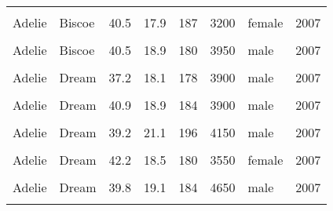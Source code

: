 \documentclass[
  landscape]{article}
\begin{document}
\begin{longtable}[l]{llllllll}
\cellcolor{gray!15}{Adelie} & \cellcolor{gray!15}{Biscoe} & \cellcolor{gray!15}{40.6} & \cellcolor{gray!15}{18.6} & \cellcolor{gray!15}{183} & \cellcolor{gray!15}{3550} & \cellcolor{gray!15}{male} & \cellcolor{gray!15}{2007}\\
Adelie & Biscoe & 40.5 & 17.9 & 187 & 3200 & female & 2007\\
\cellcolor{gray!15}{Adelie} & \cellcolor{gray!15}{Biscoe} & \cellcolor{gray!15}{37.9} & \cellcolor{gray!15}{18.6} & \cellcolor{gray!15}{172} & \cellcolor{gray!15}{3150} & \cellcolor{gray!15}{female} & \cellcolor{gray!15}{2007}\\
Adelie & Biscoe & 40.5 & 18.9 & 180 & 3950 & male & 2007\\
\cellcolor{gray!15}{Adelie} & \cellcolor{gray!15}{Dream} & \cellcolor{gray!15}{39.5} & \cellcolor{gray!15}{16.7} & \cellcolor{gray!15}{178} & \cellcolor{gray!15}{3250} & \cellcolor{gray!15}{female} & \cellcolor{gray!15}{2007}\\
Adelie & Dream & 37.2 & 18.1 & 178 & 3900 & male & 2007\\
\cellcolor{gray!15}{Adelie} & \cellcolor{gray!15}{Dream} & \cellcolor{gray!15}{39.5} & \cellcolor{gray!15}{17.8} & \cellcolor{gray!15}{188} & \cellcolor{gray!15}{3300} & \cellcolor{gray!15}{female} & \cellcolor{gray!15}{2007}\\
Adelie & Dream & 40.9 & 18.9 & 184 & 3900 & male & 2007\\
\cellcolor{gray!15}{Adelie} & \cellcolor{gray!15}{Dream} & \cellcolor{gray!15}{36.4} & \cellcolor{gray!15}{17.0} & \cellcolor{gray!15}{195} & \cellcolor{gray!15}{3325} & \cellcolor{gray!15}{female} & \cellcolor{gray!15}{2007}\\
Adelie & Dream & 39.2 & 21.1 & 196 & 4150 & male & 2007\\
\cellcolor{gray!15}{Adelie} & \cellcolor{gray!15}{Dream} & \cellcolor{gray!15}{38.8} & \cellcolor{gray!15}{20.0} & \cellcolor{gray!15}{190} & \cellcolor{gray!15}{3950} & \cellcolor{gray!15}{male} & \cellcolor{gray!15}{2007}\\
Adelie & Dream & 42.2 & 18.5 & 180 & 3550 & female & 2007\\
\cellcolor{gray!15}{Adelie} & \cellcolor{gray!15}{Dream} & \cellcolor{gray!15}{37.6} & \cellcolor{gray!15}{19.3} & \cellcolor{gray!15}{181} & \cellcolor{gray!15}{3300} & \cellcolor{gray!15}{female} & \cellcolor{gray!15}{2007}\\
Adelie & Dream & 39.8 & 19.1 & 184 & 4650 & male & 2007\\
\cellcolor{gray!15}{Adelie} & \cellcolor{gray!15}{Dream} & \cellcolor{gray!15}{36.5} & \cellcolor{gray!15}{18.0} & \cellcolor{gray!15}{182} & \cellcolor{gray!15}{3150} & \cellcolor{gray!15}{female} & \cellcolor{gray!15}{2007}\\

\end{longtable}
\end{document}
